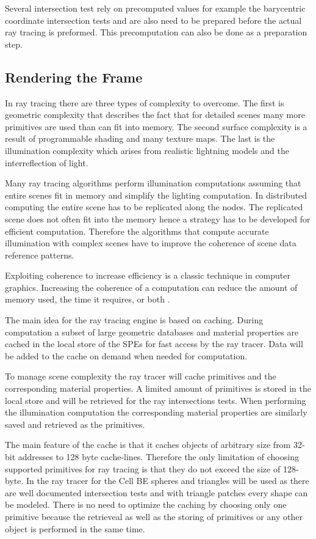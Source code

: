 \documentclass[DIV10, abstracton, openright, footsepline, headsepline, twoside, 9pt,
bigheadings]{scrreprt}
\begin{document}
Several intersection test rely on precomputed values for example the barycentric
coordinate intersection tests and are also need to be prepared before the
actual ray tracing is preformed. This precomputation can also be done as a
preparation step.

\subsection{Rendering the Frame}
\label{sec:render}

In ray tracing there are three types of complexity to overcome. The first
is geometric complexity that describes the fact that for detailed scenes
many more primitives are used than can fit into memory. The second surface
complexity is a result of programmable shading and many texture maps. The
last is the illumination complexity which arises from realistic lightning
models and the interreflection of light.

Many ray tracing algorithms perform illumination computations assuming
that entire scenes fit in memory and simplify the lighting computation.
In distributed computing the entire scene has to be replicated along
the nodes. The replicated scene does not often fit into the memory
hence a strategy has to be developed for efficient computation. Therefore
the algorithms that compute accurate illumination with complex scenes
have to improve the coherence of scene data reference patterns.

Exploiting coherence to increase efficiency is a classic technique in
computer graphics. Increasing the coherence of a computation can reduce
the amount of memory used, the time it requires, or both \cite{Pharr97}.

The main idea for the ray tracing engine is based on caching. During
computation a subset of large geometric databases and material properties
are  cached in the local store of the SPEs for fast access by the ray
tracer. Data will be added to the cache on demand when needed for
computation.

To manage scene complexity the ray tracer will cache primitives
and the corresponding material properties. A limited amount of primitives
is stored in the local store and will be retrieved for the ray intersections
tests. When performing the illumination computation the corresponding
material properties are similarly saved and retrieved as the primitives.

The main feature of the cache is that it caches objects of arbitrary size
from 32-bit addresses to 128 byte cache-lines. Therefore the only limitation
of choosing supported primitives for ray tracing is that they do not
exceed the size of 128-byte. In the ray tracer for the Cell BE spheres
and triangles will be used as there are well documented intersection tests
and with triangle patches every shape can be modeled. There is no need
to optimize the caching by choosing only one primitive because the
retrieveal as well as the storing of primitives or any other object is
performed in the same time.
\end{document}
